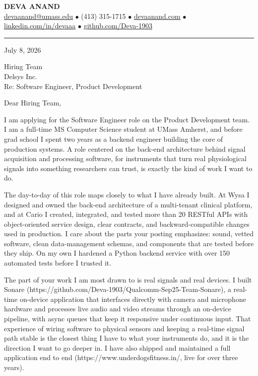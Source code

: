 \documentclass[letterpaper,11pt]{article}
\begin{document}
\begin{center}
    {\fontsize{18}{20}\selectfont\bfseries DEVA ANAND}\\ \vspace{3pt}
    {\small
    \href{mailto:devaanand@umass.edu}{devaanand@umass.edu}
    \enspace$\bullet$\enspace
    (413) 315-1715
    \enspace$\bullet$\enspace
    \href{https://devaanand.com}{devaanand.com}
    \enspace$\bullet$\enspace
    \href{https://linkedin.com/in/devaaa/}{linkedin.com/in/devaaa}
    \enspace$\bullet$\enspace
    \href{https://github.com/Deva-1903}{github.com/Deva-1903}}
\end{center}
\vspace{6pt}
\hrule
\vspace{10pt}

\noindent July 8, 2026

\vspace{4pt}

\noindent Hiring Team\\
Delsys Inc.\\
Re: Software Engineer, Product Development

\vspace{6pt}

\noindent Dear Hiring Team,

I am applying for the Software Engineer role on the Product Development team. I am a full-time MS Computer Science student at UMass Amherst, and before grad school I spent two years as a backend engineer building the core of production systems. A role centered on the back-end architecture behind signal acquisition and processing software, for instruments that turn real physiological signals into something researchers can trust, is exactly the kind of work I want to do.

The day-to-day of this role maps closely to what I have already built. At Wysa I designed and owned the back-end architecture of a multi-tenant clinical platform, and at Cario I created, integrated, and tested more than 20 RESTful APIs with object-oriented service design, clear contracts, and backward-compatible changes used in production. I care about the parts your posting emphasizes: sound, vetted software, clean data-management schemas, and components that are tested before they ship. On my own I hardened a Python backend service with over 150 automated tests before I trusted it.

The part of your work I am most drawn to is real signals and real devices. I built Sonare (https://github.com/Deva-1903/Qualcomm-Sep25-Team-Sonare), a real-time on-device application that interfaces directly with camera and microphone hardware and processes live audio and video streams through an on-device pipeline, with async queues that keep it responsive under continuous input. That experience of wiring software to physical sensors and keeping a real-time signal path stable is the closest thing I have to what your instruments do, and it is the direction I want to go deeper in. I have also shipped and maintained a full application end to end (https://www.underdogsfitness.in/, live for over three years).
\end{document}
